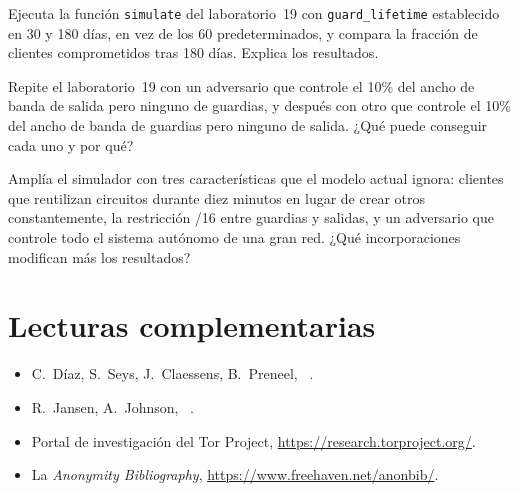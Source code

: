\begin{esercizio}[2]\label{es:29-durata}
Ejecuta la función \texttt{simulate} del laboratorio~19 con \texttt{guard\_lifetime} establecido en 30 y 180 días, en vez de los 60 predeterminados, y compara la fracción de clientes comprometidos tras 180 días. Explica los resultados.
\end{esercizio}

\begin{esercizio}[2]\label{es:29-asimmetria}
Repite el laboratorio~19 con un adversario que controle el 10\% del ancho de banda de salida pero ninguno de guardias, y después con otro que controle el 10\% del ancho de banda de guardias pero ninguno de salida. ¿Qué puede conseguir cada uno y por qué?
\end{esercizio}

\begin{esercizio}[3]\label{es:29-torps}
Amplía el simulador con tres características que el modelo actual ignora: clientes que reutilizan circuitos durante diez minutos en lugar de crear otros constantemente, la restricción /16 entre guardias y salidas, y un adversario que controle todo el sistema autónomo de una gran red. ¿Qué incorporaciones modifican más los resultados?
\end{esercizio}

\section*{Lecturas complementarias}
\begin{itemize}
  \item C.~Díaz, S.~Seys, J.~Claessens, B.~Preneel, ~\cite{diaz2002measuring}.
  \item R.~Jansen, A.~Johnson, ~\cite{jansen2016privcount}.
  \item Portal de investigación del Tor Project, \url{https://research.torproject.org/}.
  \item La \emph{Anonymity Bibliography}, \url{https://www.freehaven.net/anonbib/}.
\end{itemize}
